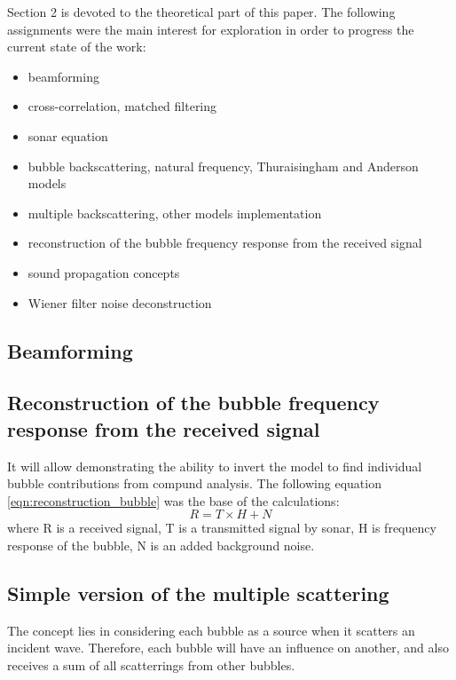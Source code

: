 Section 2 is devoted to the theoretical part of this paper. The following assignments were the main interest for exploration in order to progress the current state of the work:
\begin{itemize}
    \item beamforming
    \item cross-correlation, matched filtering
    \item sonar equation
    \item bubble backscattering, natural frequency, Thuraisingham and Anderson models
    \item multiple backscattering, other models implementation
    \item reconstruction of the bubble frequency response from the received signal
    \item sound propagation concepts
    \item Wiener filter noise deconstruction
\end{itemize}

\subsection{Beamforming}


\subsection{Reconstruction of the bubble frequency response from the received signal}

It will allow demonstrating the ability to invert the model to find individual bubble contributions from compund analysis.
The following equation \ref*{eqn:reconstruction_bubble} was the base of the calculations:
\begin{equation}
    \label{eqn:reconstruction_bubble}
    R = T \times H + N
\end{equation}
where R is a received signal, T is a transmitted signal by sonar, H is frequency response of the bubble, N is an added background noise.


\subsection{Simple version of the multiple scattering }

The concept lies in considering each bubble as a source when it scatters an incident wave. 
Therefore, each bubble will have an influence on another, and also receives a sum of all scatterrings from 
other bubbles. 


